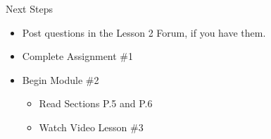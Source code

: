 \documentclass{beamer}
\begin{document}
\begin{frame}[t]{Next Steps}
\begin{itemize}
\item Post questions in the Lesson 2 Forum, if you have them.
\item Complete Assignment \#1
\item Begin Module \#2
\begin{itemize}
\item Read Sections P.5 and P.6
\item Watch Video Lesson \#3
\end{itemize}
\end{itemize}
\end{frame}
\end{document}
